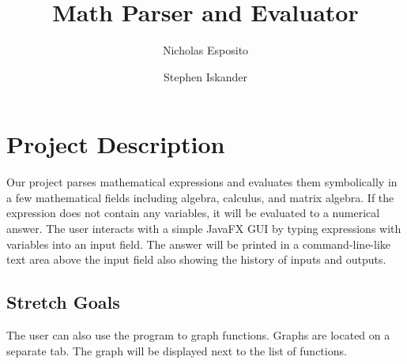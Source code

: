 \documentclass[letterpaper]{article}
\begin{document}
\title{\textbf{Math Parser and Evaluator}}
\author{Nicholas Esposito \and Stephen Iskander}

\maketitle

\section{Project Description}
Our project parses mathematical expressions and evaluates them symbolically in a few mathematical fields including algebra, calculus, and matrix algebra.
If the expression does not contain any variables, it will be evaluated to a numerical answer.
The user interacts with a simple JavaFX GUI by typing expressions with variables into an input field.
The answer will be printed in a command-line-like text area above the input field also showing the history of inputs and outputs.

\subsection{Stretch Goals}
The user can also use the program to graph functions.
Graphs are located on a separate tab.
The graph will be displayed next to the list of functions.
\end{document}
